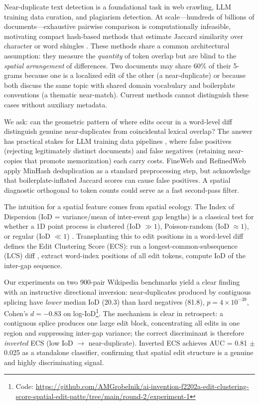 \documentclass[11pt,letterpaper]{article}
\begin{document}
Near-duplicate text detection is a foundational task in web crawling, LLM training data curation, and plagiarism detection. At scale---hundreds of billions of documents---exhaustive pairwise comparison is computationally infeasible, motivating compact hash-based methods that estimate Jaccard similarity over character or word shingles \citep{Broder1997, Manku2007}. These methods share a common architectural assumption: they measure the \emph{quantity} of token overlap but are blind to the \emph{spatial arrangement} of differences. Two documents may share 60\% of their 5-grams because one is a localized edit of the other (a near-duplicate) or because both discuss the same topic with shared domain vocabulary and boilerplate conventions (a thematic near-match). Current methods cannot distinguish these cases without auxiliary metadata.

We ask: can the geometric pattern of where edits occur in a word-level diff distinguish genuine near-duplicates from coincidental lexical overlap? The answer has practical stakes for LLM training data pipelines \citep{Lee2022, Gao2020, Penedo2024, Penedo2023}, where false positives (rejecting legitimately distinct documents) and false negatives (retaining near-copies that promote memorization) each carry costs. FineWeb \citep{Penedo2024} and RefinedWeb \citep{Penedo2023} apply MinHash deduplication as a standard preprocessing step, but acknowledge that boilerplate-inflated Jaccard scores can cause false positives. A spatial diagnostic orthogonal to token counts could serve as a fast second-pass filter.

The intuition for a spatial feature comes from spatial ecology. The Index of Dispersion (IoD = variance/mean of inter-event gap lengths) is a classical test for whether a 1D point process is clustered (IoD $\gg 1$), Poisson-random (IoD $\approx 1$), or regular (IoD $\ll 1$) \citep{Cox1966}. Transplanting this to edit positions in a word-level diff defines the Edit Clustering Score (ECS): run a longest-common-subsequence (LCS) diff \citep{Hunt1977}, extract word-index positions of all edit tokens, compute IoD of the inter-gap sequence.

Our experiments on two 900-pair Wikipedia benchmarks yield a clear finding with an instructive directional inversion: near-duplicates produced by contiguous splicing have \emph{lower} median IoD (20.3) than hard negatives (81.8), $p = 4 \times 10^{-39}$, Cohen's $d = -0.83$ on log-IoD\footnote{Code: \url{https://github.com/AMGrobelnik/ai-invention-f2202a-edit-clustering-score-spatial-edit-patte/tree/main/round-2/experiment-1}}. The mechanism is clear in retrospect: a contiguous splice produces one large edit block, concentrating all edits in one region and suppressing inter-gap variance; the correct discriminant is therefore \emph{inverted} ECS (low IoD $\to$ near-duplicate). Inverted ECS achieves AUC = 0.81 $\pm$ 0.025 as a standalone classifier, confirming that spatial edit structure is a genuine and highly discriminating signal.
\end{document}
